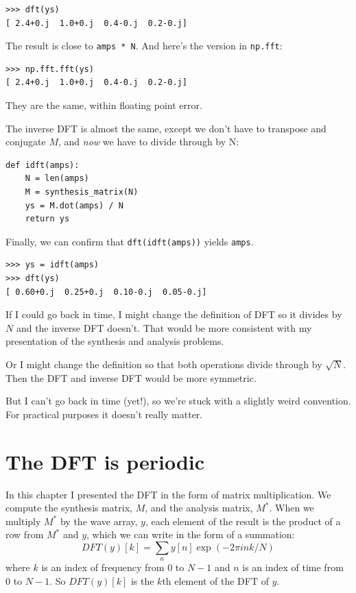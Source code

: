 \documentclass[12pt]{book}
\begin{document}
\begin{verbatim}
>>> dft(ys)
[ 2.4+0.j  1.0+0.j  0.4-0.j  0.2-0.j]
\end{verbatim}

The result is close to {\tt amps * N}.
And here's the version in {\tt np.fft}:

\begin{verbatim}
>>> np.fft.fft(ys)
[ 2.4+0.j  1.0+0.j  0.4-0.j  0.2-0.j]
\end{verbatim}

They are the same, within floating point error.

The inverse DFT is almost the same, except we don't have to transpose
and conjugate $M$, and {\em now} we have to divide through by N:

\begin{verbatim}
def idft(amps):
    N = len(amps)
    M = synthesis_matrix(N)
    ys = M.dot(amps) / N
    return ys
\end{verbatim}

Finally, we can confirm that {\tt dft(idft(amps))} yields {\tt amps}.

\begin{verbatim}
>>> ys = idft(amps)
>>> dft(ys)
[ 0.60+0.j  0.25+0.j  0.10-0.j  0.05-0.j]
\end{verbatim}

If I could go back in time, I might change the definition of
DFT so it divides by $N$ and the inverse DFT doesn't.  That would
be more consistent with my presentation of the synthesis and analysis
problems.

Or I might change the definition so that both operations divide
through by $\sqrt{N}$.  Then the DFT and inverse DFT would be
more symmetric.

But I can't go back in time (yet!), so we're stuck with a slightly
weird convention.  For practical purposes it doesn't really
matter.


\section{The DFT is periodic}

In this chapter I presented the DFT in the form of matrix multiplication.
We compute the synthesis matrix, $M$, and the analysis matrix, $M^*$.
When we multiply $M^{*}$ by the wave array, $y$, each element of the
result is the product of a row from $M^*$ and $y$, which we can
write in the form of a summation:
%
\[ DFT(y)[k] = \sum_n y[n] \exp(-2 \pi i n k / N) \]
%
where $k$ is an index of frequency from
$0$ to $N-1$ and $n$ is an index of time from $0$ to $N-1$.
So $DFT(y)[k]$ is the $k$th element of the DFT of $y$.
\end{document}
